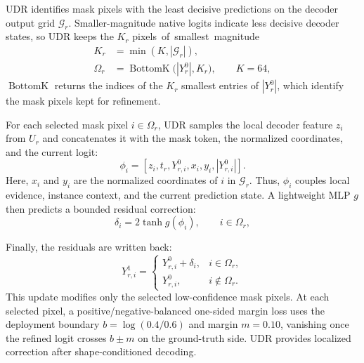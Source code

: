 \documentclass{article}
\begin{document}
\indent UDR identifies mask pixels with the least decisive predictions on the decoder output grid $\mathcal{G}_r$. Smaller-magnitude native logits indicate less decisive decoder states, so UDR keeps the $K_r$ \mbox{pixels of smallest magnitude}
\begin{equation}
\begin{aligned}
K_r&=\min(K,|\mathcal{G}_r|),\\
\Omega_r&=\operatorname{BottomK}\bigl(|Y_r^0|,K_r\bigr),\qquad K=64,
\end{aligned}
\label{eq:udpr-selection}
\end{equation}
\indent $\operatorname{BottomK}$ returns the indices of the $K_r$ smallest entries of $|Y_r^0|$, which identify the mask pixels kept for refinement.

\indent For each selected mask pixel $i\in\Omega_r$, UDR samples the local decoder feature $z_i$ from $U_r$ and concatenates it with the mask token, the normalized coordinates, and the current logit:
\begin{equation}
\phi_i=[z_i,t_r,Y^0_{r,i},x_i,y_i,|Y^0_{r,i}|].
\label{eq:udpr-input}
\end{equation}
\indent Here, $x_i$ and $y_i$ are the normalized coordinates of $i$ in $\mathcal{G}_r$. Thus, $\phi_i$ couples local evidence, instance context, and the current prediction state. A lightweight MLP $g$ then predicts a bounded residual correction:
\begin{equation}
\delta_i=2\tanh g(\phi_i),\qquad i\in\Omega_r,
\label{eq:udpr}
\end{equation}

\indent Finally, the residuals are written back:
\begin{equation}
Y^1_{r,i}=\begin{cases}
Y^0_{r,i}+\delta_i, & i\in\Omega_r,\\
Y^0_{r,i}, & i\notin\Omega_r.
\end{cases}
\label{eq:udpr-scatter}
\end{equation}
 \indent This update modifies only the selected low-confidence mask pixels. At each selected pixel, a positive/negative-balanced one-sided margin loss uses the deployment boundary $b=\log(0.4/0.6)$ and margin $m=0.10$, vanishing once the refined logit crosses $b\pm m$ on the ground-truth side. UDR provides localized correction after shape-conditioned decoding.
\end{document}
